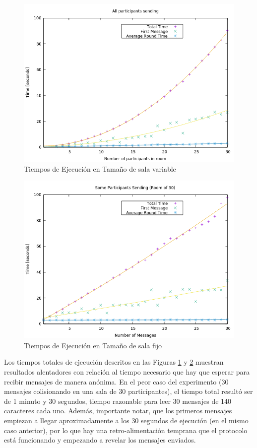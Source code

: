 \begin{figure}[H]
  \centering
    \includegraphics[scale=0.7]{logs/logs_all/times.png}
  \caption{Tiempos de Ejecución en Tamaño de sala variable}
  \label{fig:times-variable}
\end{figure}

\begin{figure}[H]
  \centering
    \includegraphics[scale=0.7]{logs/logs_partial_30/times.png}
  \caption{Tiempos de Ejecución en Tamaño de sala fijo}
  \label{fig:times-fixed}
\end{figure}

Los tiempos totales de ejecución descritos en las Figuras 
\ref{fig:times-variable} y \ref{fig:times-fixed} 
muestran resultados alentadores con relación al tiempo necesario que hay 
que esperar para recibir mensajes de manera anónima. En el peor caso del 
experimento (30 mensajes colisionando en una sala de 30 participantes), el 
tiempo total resultó ser de 1 minuto y 30 segundos, tiempo razonable para 
leer 30 mensajes de 140 caracteres cada uno. Además, importante notar, que 
los primeros mensajes empiezan a llegar aproximadamente a los 30 segundos 
de ejecución (en el mismo caso anterior), por lo que hay una 
retro-alimentación temprana que el protocolo está funcionando y empezando a 
revelar los mensajes enviados.

